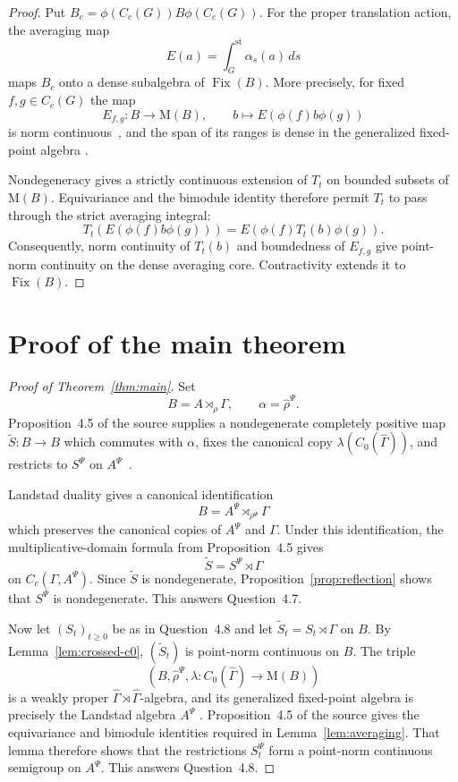 \documentclass[11pt]{article}
\theoremstyle{remark}
\newcommand{\M}{\mathrm M}
\newcommand{\Fix}{\operatorname{Fix}}
\begin{document}
\begin{proof}
Put $B_c=\phi(C_c(G))B\phi(C_c(G))$. For the proper translation action,
the averaging map
\[
 E(a)=\int_G^{\mathrm{st}}\alpha_s(a)\,ds
\]
maps $B_c$ onto a dense subalgebra of $\Fix(B)$. More precisely, for fixed
$f,g\in C_c(G)$ the map
\[
 E_{f,g}:B\longrightarrow\M(B),\qquad
 b\longmapsto E(\phi(f)b\phi(g))
\]
is norm continuous~\cite[Lemma~2.5(4)]{BussEchterhoff}, and the span of its
ranges is dense in the generalized fixed-point algebra
\cite[Proposition~2.2 and Definition~2.8]{BussEchterhoff}.

Nondegeneracy gives a strictly continuous extension of $T_t$ on bounded
subsets of $\M(B)$. Equivariance and the bimodule identity therefore permit
$T_t$ to pass through the strict averaging integral:
\[
 T_t\!\left(E(\phi(f)b\phi(g))\right)
 =E\!\left(\phi(f)T_t(b)\phi(g)\right).
\]
Consequently, norm continuity of $T_t(b)$ and boundedness of $E_{f,g}$ give
point-norm continuity on the dense averaging core. Contractivity extends it
to $\Fix(B)$.
\end{proof}

\section{Proof of the main theorem}

\begin{proof}[Proof of Theorem~\ref{thm:main}]
Set
\[
 B=A\rtimes_\rho\Gamma,
 \qquad \alpha=\widehat\rho^\Psi .
\]
Proposition~4.5 of the source supplies a nondegenerate completely positive
map $\widetilde S:B\to B$ which commutes with $\alpha$, fixes the canonical
copy $\lambda(C_0(\widehat\Gamma))$, and restricts to $S^\Psi$ on
$A^\Psi$~\cite{SkalskiViselter}.

Landstad duality gives a canonical identification
\[
 B=A^\Psi\rtimes_{\rho^\Psi}\Gamma
\]
which preserves the canonical copies of $A^\Psi$ and $\Gamma$. Under this
identification, the multiplicative-domain formula from Proposition~4.5 gives
\[
 \widetilde S=S^\Psi\rtimes\Gamma
\]
on $C_c(\Gamma,A^\Psi)$. Since $\widetilde S$ is nondegenerate,
Proposition~\ref{prop:reflection} shows that $S^\Psi$ is nondegenerate.
This answers Question~4.7.

Now let $(S_t)_{t\geq0}$ be as in Question~4.8 and let
$\widetilde S_t=S_t\rtimes\Gamma$ on $B$. By
Lemma~\ref{lem:crossed-c0}, $(\widetilde S_t)$ is point-norm continuous on
$B$. The triple
\[
 (B,\widehat\rho^\Psi,\lambda:C_0(\widehat\Gamma)\to\M(B))
\]
is a weakly proper
$\widehat\Gamma\rtimes\widehat\Gamma$-algebra, and its generalized
fixed-point algebra is precisely the Landstad algebra $A^\Psi$
\cite[Theorem~4.6]{BussEchterhoff}. Proposition~4.5 of the source gives the
equivariance and bimodule identities required in
Lemma~\ref{lem:averaging}. That lemma therefore shows that the restrictions
$S_t^\Psi$ form a point-norm continuous semigroup on $A^\Psi$. This answers
Question~4.8.
\end{proof}
\end{document}
